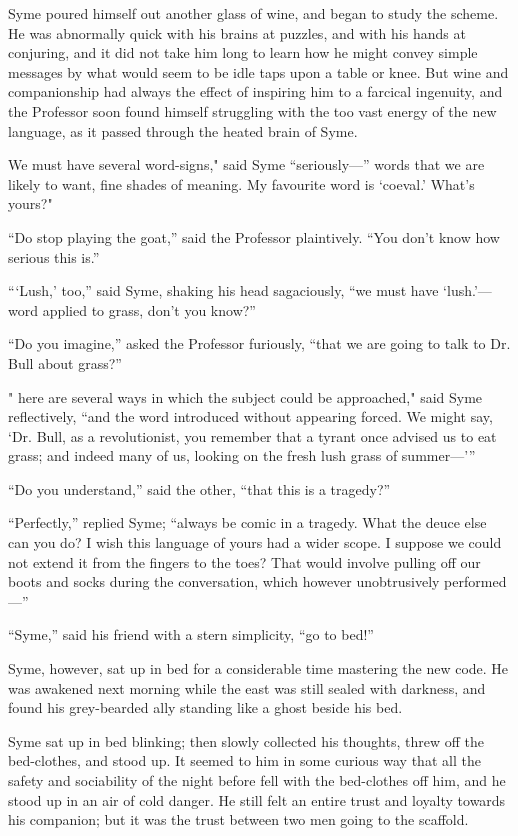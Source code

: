 \documentclass{book}
\begin{document}
Syme poured himself out another glass of wine, and began to study the scheme. He was abnormally quick with his brains at puzzles, and with his hands at conjuring, and it did not take him long to learn how he might convey simple messages by what would seem to be idle taps upon a table or knee. But wine and companionship had always the effect of inspiring him to a farcical ingenuity, and the Professor soon found himself struggling with the too vast energy of the new language, as it passed through the heated brain of Syme.

We must have several word-signs," said Syme “seriously—” words that we are likely to want, fine shades of meaning. My favourite word is ‘coeval.’ What’s yours?"

“Do stop playing the goat,” said the Professor plaintively. “You don’t know how serious this is.”

“‘Lush,’ too,” said Syme, shaking his head sagaciously, “we must have ‘lush.’—word applied to grass, don’t you know?”

“Do you imagine,” asked the Professor furiously, “that we are going to talk to Dr. Bull about grass?”

" here are several ways in which the subject could be approached," said Syme reflectively, “and the word introduced without appearing forced. We might say, ‘Dr. Bull, as a revolutionist, you remember that a tyrant once advised us to eat grass; and indeed many of us, looking on the fresh lush grass of summer—’”

“Do you understand,” said the other, “that this is a tragedy?”

“Perfectly,” replied Syme; “always be comic in a tragedy. What the deuce else can you do? I wish this language of yours had a wider scope. I suppose we could not extend it from the fingers to the toes? That would involve pulling off our boots and socks during the conversation, which however unobtrusively performed—”

“Syme,” said his friend with a stern simplicity, “go to bed!”

Syme, however, sat up in bed for a considerable time mastering the new code. He was awakened next morning while the east was still sealed with darkness, and found his grey-bearded ally standing like a ghost beside his bed.

Syme sat up in bed blinking; then slowly collected his thoughts, threw off the bed-clothes, and stood up. It seemed to him in some curious way that all the safety and sociability of the night before fell with the bed-clothes off him, and he stood up in an air of cold danger. He still felt an entire trust and loyalty towards his companion; but it was the trust between two men going to the scaffold.
\end{document}
